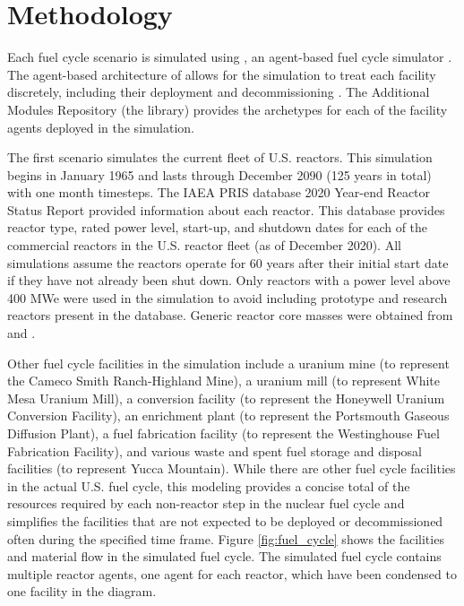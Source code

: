 \section{Methodology}

Each fuel cycle scenario is simulated using \Cyclus, an 
agent-based fuel cycle simulator \cite{huff_fundamental_2016}. 
The agent-based architecture of \Cyclus allows for the simulation to treat
each facility discretely, including their deployment and 
decommissioning \cite{huff_fundamental_2016}. The \Cyclus 
Additional Modules Repository (the \Cycamore library) provides 
the archetypes for each of the facility agents deployed in the simulation.

The first scenario simulates the current fleet of U.S. reactors. This 
simulation begins in January 1965 and lasts through December 2090 (125 
years in total) with one month timesteps. The \gls{IAEA} \gls{PRIS} 
database \cite{noauthor_power_1989} 2020 
Year-end Reactor Status Report provided information about each reactor.
This database provides reactor type, rated power level, start-up, and 
shutdown dates for each of the commercial reactors in the U.S. reactor 
fleet (as of December 2020). All simulations assume 
the reactors operate for 60 years after their
initial start date if they have not already been shut down. Only reactors
with a power level above 400 MWe were 
used in the simulation to avoid including prototype and research reactors 
present in the database. Generic reactor core masses were obtained from 
\cite{todreas_nuclear_2012} and \cite{cacuci_handbook_2010}. 

Other fuel cycle facilities in the simulation include a uranium mine (to 
represent the Cameco Smith Ranch-Highland Mine), a uranium mill (to 
represent White Mesa Uranium Mill), a conversion facility (to represent 
the Honeywell Uranium Conversion Facility), an enrichment plant (to represent 
the Portsmouth Gaseous Diffusion Plant), a fuel fabrication facility (to 
represent the Westinghouse Fuel Fabrication Facility), and various waste and 
spent fuel storage and disposal facilities (to represent Yucca Mountain). 
While there
are other fuel cycle facilities in the actual U.S. fuel cycle, this 
modeling provides a concise total of the resources required 
by each non-reactor step in the nuclear fuel cycle and simplifies the 
facilities that are not expected to be deployed or decommissioned often 
during the specified time frame. Figure \ref{fig:fuel_cycle} shows 
the facilities and material flow in the simulated fuel cycle. The simulated 
fuel cycle contains multiple reactor agents, one agent for each reactor, 
which have been condensed to one facility in the diagram.



